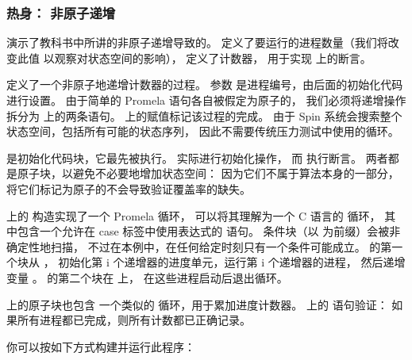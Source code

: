\subsubsection{热身：
			非原子递增}
\label{sec:formal:Warm-Up: Non-Atomic Increment}

\begin{fcvref}
演示了教科书中所讲的非原子递增导致的。
 定义了要运行的进程数量（我们将改变此值
以观察对状态空间的影响）， 定义了计数器，
 用于实现
 上的断言。

\begin{listing}

\caption{非原子递增的 Promela 代码}
\label{lst:formal:Promela Code for Non-Atomic Increment}
\end{listing}

 定义了一个非原子地递增计数器的过程。
参数  是进程编号，由后面的初始化代码进行设置。
由于简单的 Promela 语句各自被假定为原子的，
我们必须将递增操作拆分为
 上的两条语句。
 上的赋值标记该过程的完成。
由于 Spin 系统会搜索整个状态空间，包括所有可能的状态序列，
因此不需要传统压力测试中使用的循环。

 是初始化代码块，它最先被执行。
 实际进行初始化操作，
而  执行断言。
两者都是原子块，以避免不必要地增加状态空间：
因为它们不属于算法本身的一部分，
将它们标记为原子的不会导致验证覆盖率的缺失。

 上的  构造实现了一个 Promela 循环，
可以将其理解为一个 C 语言的  循环，
其中包含一个允许在 case 标签中使用表达式的  语句。
条件块（以 \co{::} 为前缀）会被非确定性地扫描，
不过在本例中，在任何给定时刻只有一个条件可能成立。
 的第一个块从
，
初始化第 i 个递增器的进度单元，运行第 i 个递增器的进程，
然后递增变量 。
 的第二个块在  上，
在这些进程启动后退出循环。

 上的原子块也包含
一个类似的  循环，用于累加进度计数器。
 上的  语句验证：
如果所有进程都已完成，则所有计数都已正确记录。
\end{fcvref}

你可以按如下方式构建并运行此程序：

